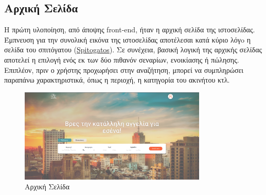 \documentclass{acmart}
\begin{document}
\subsection*{Αρχική Σελίδα}
Η πρώτη υλοποίηση, από άποψης front-end, ήταν η αρχική σελίδα της ιστοσελίδας. Έμπνευση για την συνολική εικόνα της ιστοσελίδας αποτέλεσαι κατά κύριο λόγo η σελίδα του σπιτόγατου (\href{www.spitogatos.gr}{Spitogatos}). 
Σε συνέχεια, βασική λογική της αρχικής σελίδας αποτελεί η επιλογή ενός εκ των δύο πιθανόν σεναρίων, ενοικίασης ή πώλησης. Επιπλέον, πριν ο χρήστης προχωρήσει στην αναζήτηση, μπορεί να συμπληρώσει παραπάνω χαρακτηριστικά, όπως η περιοχή, η κατηγορία του ακινήτου κτλ.
\begin{figure}[H]
       \includegraphics[width=0.8\textwidth]{home_page.png}
       \caption{Αρχική Σελίδα}
       \label{fig:home}
\end{figure}
\end{document}
